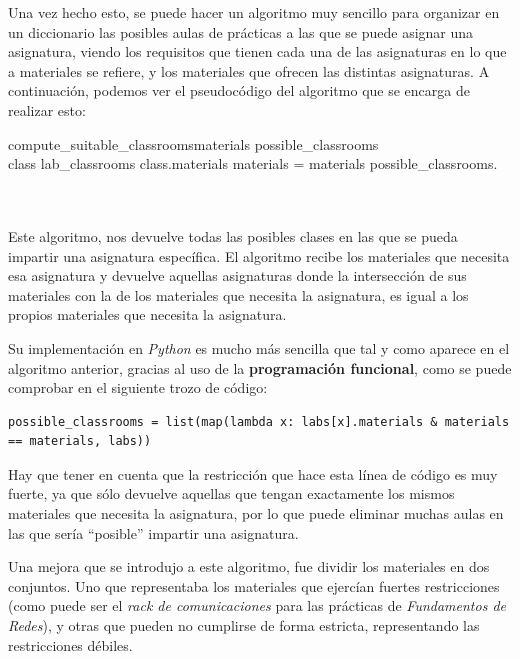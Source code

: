 Una vez hecho esto, se puede hacer un algoritmo muy sencillo para organizar en un diccionario las posibles aulas de prácticas a las que se puede asignar una asignatura, viendo los requisitos que tienen cada una de las asignaturas en lo que a materiales se refiere, y los materiales que ofrecen las distintas asignaturas. A continuación, podemos ver el pseudocódigo del algoritmo que se encarga de realizar esto:

\begin{pseudocode}[shadowbox]{compute\_suitable\_classrooms}{materials}
    possible\_classrooms \GETS []\\
    \FOREACH class \in lab\_classrooms \DO
    \BEGIN
        \IF class.materials \cap materials = materials \DO
        \BEGIN
            possible\_classrooms.\\
        \END
    \END\\
    \\
    \label{computeclass}
\end{pseudocode}

Este algoritmo, nos devuelve todas las posibles clases en las que se pueda impartir una asignatura específica. El algoritmo recibe los materiales que necesita esa asignatura y devuelve aquellas asignaturas donde la intersección de sus materiales con la de los materiales que necesita la asignatura, es igual a los propios materiales que necesita la asignatura.

Su implementación en \textit{Python} es mucho más sencilla que tal y como aparece en el algoritmo anterior, gracias al uso de la \textbf{programación funcional}, como se puede comprobar en el siguiente trozo de código:

\begin{verbatim}
possible_classrooms = list(map(lambda x: labs[x].materials & materials == materials, labs))
\end{verbatim}

Hay que tener en cuenta que la restricción que hace esta línea de código es muy fuerte, ya que sólo devuelve aquellas que tengan exactamente los mismos materiales que necesita la asignatura, por lo que puede eliminar muchas aulas en las que sería ``posible'' impartir una asignatura.

Una mejora que se introdujo a este algoritmo, fue dividir los materiales en dos conjuntos. Uno que representaba los materiales que ejercían fuertes restricciones (como puede ser el \textit{rack de comunicaciones} para las prácticas de \textit{Fundamentos de Redes}), y otras que pueden no cumplirse de forma estricta, representando las restricciones débiles.

